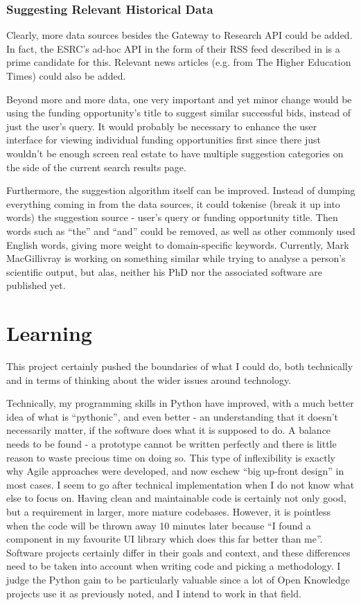 \subsubsection{Suggesting Relevant Historical Data}

Clearly, more data sources besides the Gateway to Research API could be added. In fact, the ESRC's ad-hoc API in the form of their RSS feed described in  is a prime candidate for this. Relevant news articles (e.g. from The Higher Education Times) could also be added.

Beyond more and more data, one very important and yet minor change would be using the funding opportunity's title to suggest similar successful bids, instead of just the user's query. It would probably be necessary to enhance the user interface for viewing individual funding opportunities first since there just wouldn't be enough screen real estate to have multiple suggestion categories on the side of the current search results page.

Furthermore, the suggestion algorithm itself can be improved. Instead of dumping everything coming in from the data sources, it could tokenise (break it up into words) the suggestion source - user's query or funding opportunity title. Then words such as ``the'' and ``and'' could be removed, as well as other commonly used English words, giving more weight to domain-specific keywords. Currently, Mark MacGillivray \cite{mark} is working on something similar while trying to analyse a person's scientific output, but alas, neither his PhD nor the associated software are published yet.

\section{Learning}

This project certainly pushed the boundaries of what I could do, both technically and in terms of thinking about the wider issues around technology.

Technically, my programming skills in Python have improved, with a much better idea of what is ``pythonic'', and even better - an understanding that it doesn't necessarily matter, if the software does what it is supposed to do. A balance needs to be found - a prototype cannot be written perfectly and there is little reason to waste precious time on doing so. This type of inflexibility is exactly why Agile approaches were developed, and now eschew ``big up-front design'' in most cases. I seem to go after technical implementation when I do not know what else to focus on. Having clean and maintainable code is certainly not only good, but a requirement in larger, more mature codebases. However, it is pointless when the code will be thrown away 10 minutes later because ``I found a component in my favourite UI library which does this far better than me''. Software projects certainly differ in their goals and context, and these differences need to be taken into account when writing code and picking a methodology. I judge the Python gain to be particularly valuable since a lot of Open Knowledge projects use it as previously noted, and I intend to work in that field.

